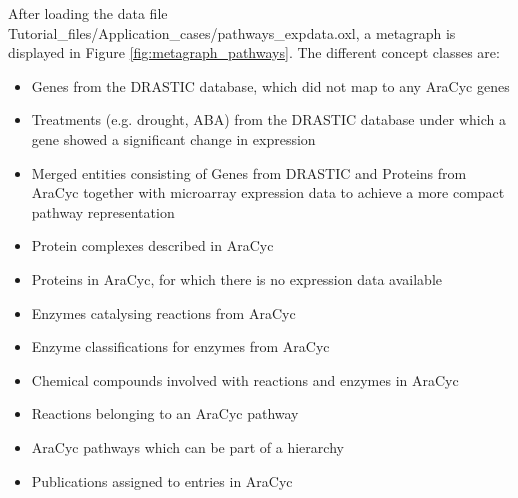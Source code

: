 After loading the data file Tutorial\_files/Application\_cases/pathways\_expdata.oxl, a metagraph is displayed in Figure \ref{fig:metagraph_pathways}.
The different concept classes are:
\begin{itemize}
\item Genes from the DRASTIC database, which did not map to any AraCyc genes
\item Treatments (e.g. drought, ABA) from the DRASTIC database under which a gene showed a significant change in expression
\item Merged entities consisting of Genes from DRASTIC and Proteins from AraCyc together with microarray expression data to achieve a more compact pathway representation
\item Protein complexes described in AraCyc
\item Proteins in AraCyc, for which there is no expression data available
\item Enzymes catalysing reactions from AraCyc
\item Enzyme classifications for enzymes from AraCyc
\item Chemical compounds involved with reactions and enzymes in AraCyc
\item Reactions belonging to an AraCyc pathway
\item AraCyc pathways which can be part of a hierarchy
\item Publications assigned to entries in AraCyc
\end{itemize}

